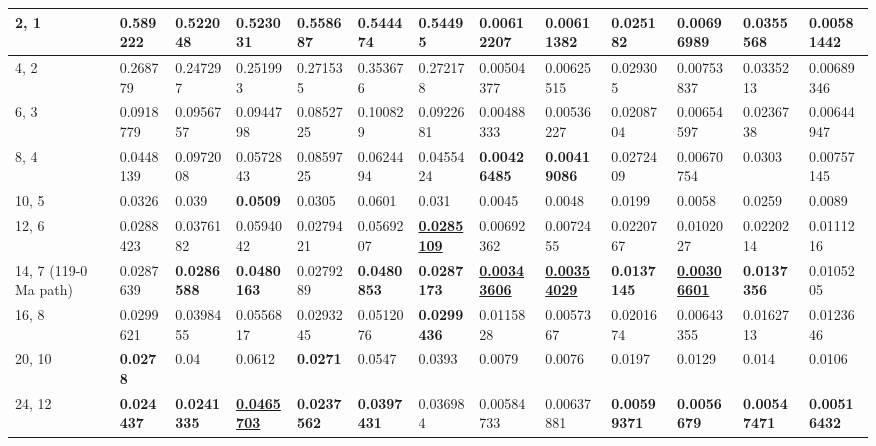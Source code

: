 \begin{table*}
{\begin{tabular}{|l|l|l|l|l|l|l|l|l|l|l|l|l|}
2, 1 & 0.589222 & 0.522048 & 0.523031 & 0.558687 & 0.544474 & 0.54495 & 0.00612207 & 0.00611382 & 0.025182 & 0.00696989 & 0.0355568 & {\color[HTML]{34FF34} \textbf{0.00581442}} \\ \hline
4, 2 & 0.268779 & 0.247297 & 0.251993 & 0.271535 & 0.353676 & 0.272178 & 0.00504377 & 0.00625515 & 0.029305 & 0.00753837 & 0.0335213 & 0.00689346 \\ \hline
6, 3 & 0.0918779 & 0.0956757 & 0.0944798 & 0.0852725 & 0.100829 & 0.0922681 & 0.00488333 & 0.00536227 & 0.0208704 & 0.00654597 & 0.0236738 & 0.00644947 \\ \hline
8, 4 & 0.0448139 & 0.0972008 & 0.0572843 & 0.0859725 & 0.0624494 & 0.0455424 & {\color[HTML]{34FF34} \textbf{0.00426485}} & {\color[HTML]{32CB00} \textbf{0.00419086}} & 0.0272409 & 0.00670754 & 0.0303 & 0.00757145 \\ \hline
10, 5 & 0.0326 & 0.039 & {\color[HTML]{34FF34} \textbf{0.0509}} & 0.0305 & 0.0601 & 0.031 &
  0.0045 & 0.0048 & 0.0199 & 0.0058 &
  0.0259 & 0.0089 \\ \hline
12, 6 & 0.0288423 & 0.0376182 & 0.0594042 & 0.0279421 & 0.0569207 & {\color[HTML]{009901} {\ul \textbf{0.0285109}}} & 0.00692362 & 0.0072455 & 0.0220767 & 0.0102027 & 0.0220214 & 0.0111216 \\ \hline
14, 7 (119-0 Ma path) & 0.0287639 & {\color[HTML]{34FF34} \textbf{0.0286588}} & {\color[HTML]{32CB00} \textbf{0.0480163}} & 0.0279289 & {\color[HTML]{34FF34} \textbf{0.0480853}} & {\color[HTML]{32CB00} \textbf{0.0287173}} & {\color[HTML]{009901} {\ul \textbf{0.00343606}}} & {\color[HTML]{009901} {\ul
  \textbf{0.00354029}}} & {\color[HTML]{34FF34} \textbf{0.0137145}} & {\color[HTML]{009901} {\ul \textbf{0.00306601}}} & {\color[HTML]{34FF34} \textbf{0.0137356}} & 0.0105205 \\ \hline
16, 8 & 0.0299621 & 0.0398455 & 0.0556817 & 0.0293245 & 0.0512076 & {\color[HTML]{34FF34} \textbf{0.0299436}} & 0.0115828 & 0.0057367 & 0.0201674 & 0.00643355 & 0.0162713 & 0.0123646 \\ \hline
20, 10 & {\color[HTML]{34FF34} \textbf{0.0278}} & 0.04 & 0.0612 & {\color[HTML]{34FF34} \textbf{0.0271}} & 0.0547 & 0.0393 & 0.0079 & 0.0076 &
  0.0197 & 0.0129 & 0.014 & 0.0106 \\ \hline
24, 12 & {\color[HTML]{32CB00} \textbf{0.024437}} & {\color[HTML]{32CB00} \textbf{0.0241335}} & {\color[HTML]{009901} {\ul \textbf{0.0465703}}} & {\color[HTML]{32CB00} \textbf{0.0237562}} & {\color[HTML]{32CB00} \textbf{0.0397431}} & 0.036984 & 0.00584733 & 0.00637881 & {\color[HTML]{32CB00} \textbf{0.00599371}} & {\color[HTML]{34FF34} \textbf{0.0056679}} & {\color[HTML]{32CB00} \textbf{0.00547471}} & {\color[HTML]{32CB00} \textbf{0.00516432}} \\ \hline

\end{tabular}}
\end{table*}
